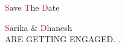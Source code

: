 \documentclass{letter}
\newcommand{\h}[1]{\textcolor{FireBrick}{#1}}
\begin{document}
\vspace*{\fill}
{\hspace{3cm} \LobsterTwo \fontsize{36}{38}\selectfont \h{S}ave \h{T}he \h{D}ate}
\vfill

{\centering \carolyna\fontsize{40}{38}\selectfont \h{S}arika \& \h{D}hanesh\\}
{\imfell \centering \normalsize \centering \hspace{5cm}\uppercase{are getting engaged. .}}
\vspace*{\fill}

\end{document}
